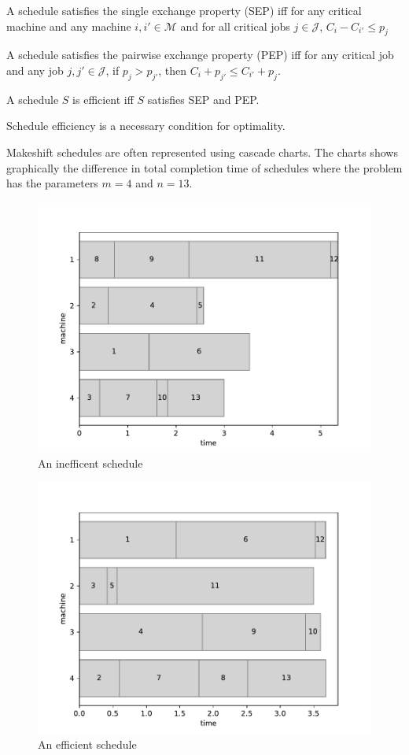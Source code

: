 \begin{definition}
	A schedule satisfies the single exchange property (SEP) iff for any critical machine and any machine $i,i'\in\mathcal{M}$ and for all critical jobs $j\in\mathcal{J}$, $C_i-C_{i'}\leq p_j$
\end{definition}

\begin{definition}
	A schedule satisfies the pairwise exchange property (PEP) iff for any critical job and any job $j,j'\in\mathcal{J}$, if $p_j>p_{j'}$, then $C_i+p_{j'}\leq C_{i'}+p_j$.
\end{definition}

\begin{definition}
	A schedule $S$ is efficient iff $S$ satisfies SEP and PEP.
\end{definition}

\begin{theorem}
	Schedule efficiency is a necessary condition for optimality.
\end{theorem}

Makeshift schedules are often represented using cascade charts. The charts shows graphically the difference in total completion time of schedules where the problem has the parameters $m=4$ and $n=13$.

\begin{figure}[H]
	\begin{center}
		\includegraphics[width=.6\linewidth]{figures/makeshift1.pdf}
	\end{center}
	\caption{An inefficent schedule}
\end{figure}

\begin{figure}[H]
	\begin{center}
		\includegraphics[width=.6\linewidth]{figures/makeshift2.pdf}	
	\end{center}
	\caption{An efficient schedule}
\end{figure}

